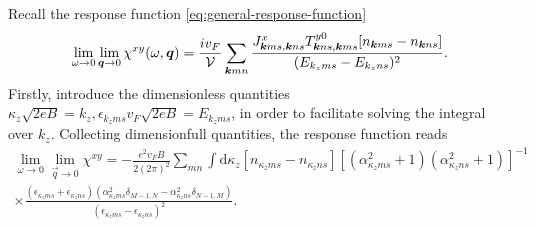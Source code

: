 Recall the response function \eqref{eq:general-response-function}
\begin{equation}
  \lim_{\omega \to 0} \lim_{\vec{q} \to 0} \chi^{xy}(\omega, \vec{q}) = \frac{i v_F }{\mathcal{V}} \sum\limits_{\vec{k} m n}^{}
  \frac{
    J^x_{\vec{k} m s, \vec{k} n s} T^{y 0}_{\vec{k} n s, \vec{k} m s} [n_{\vec{k} m s} - n_{\vec{k} n s}]
  }{
    (E_{k_z m s} - E_{k_z n s})^2
  }.
\end{equation}
Firstly, introduce the dimensionless quantities \( \kappa_z \sqrt{2 eB} = k_z, \epsilon_{k_z m s} v_F \sqrt{2 e B} = E_{k_z m s}  \), in order to facilitate solving the integral over \( k_z \).
Collecting dimensionfull quantities, the response function reads
\begin{multline}
  \label{eq:90}
\lim_{\omega \to 0} \lim_{\vec{q} \to 0} \chi^{xy} =
  -\frac{e^2 v_F B }{2 (2 \pi)^2}
  \sum\limits_{m n}^{}
  \int \mathrm{d} \kappa_z
  [n_{\kappa_z m s} - n_{\kappa_z n s}]
  [(\alpha_{\kappa_z m s}^2 + 1) (\alpha_{\kappa_z n s}^2 + 1)]^{-1}\\
  \times
  \frac{
    (\epsilon_{\kappa_z m s} + \epsilon_{\kappa_z n s})
    (\alpha_{\kappa_z m s}^2 \delta_{M-1, N} - \alpha_{\kappa_z n s}^2 \delta_{N-1, M})
  }{
    (\epsilon_{\kappa_z m s} - \epsilon_{\kappa_z n s})^2
  }.
\end{multline}

